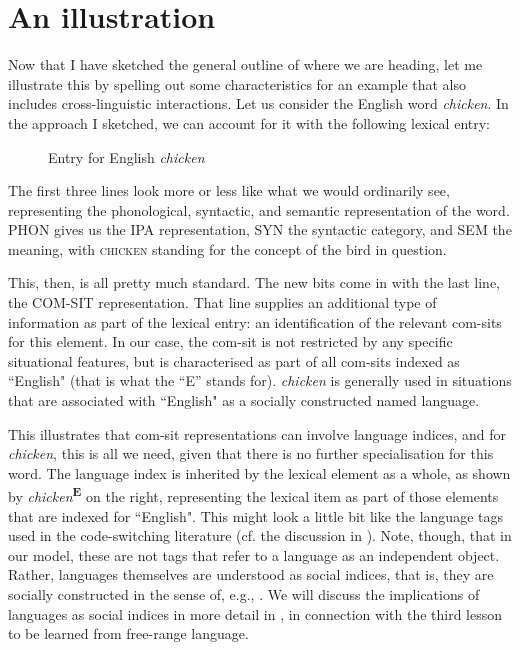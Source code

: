 \section{An illustration}
\label{sec:1.3}

Now that I have sketched the general outline of where we are heading, let me illustrate this by spelling out some characteristics for an example that also includes cross-linguistic interactions. Let us consider the English word \textit{chicken}. In the approach I sketched, we can account for it with the following lexical entry:

\begin{figure} [H]
\caption{Entry for English \textit{chicken}}
\label{fig:3}
\end{figure}

The first three lines look more or less like what we would ordinarily see, representing the phonological, syntactic, and semantic representation of the word. PHON gives us the IPA representation, SYN the syntactic category, and SEM the meaning, with \textsc{chicken} standing for the concept of the bird in question.

This, then, is all pretty much standard. The new bits come in with the last line, the COM-SIT representation. That line supplies an additional type of information as part of the lexical entry: an identification of the relevant com-sits for this element. In our case, the com-sit is not restricted by any specific situational features, but is characterised as part of all com-sits indexed as “English" (that is what the “E” stands for). \textit{chicken} is generally used in situations that are associated with “English" as a socially constructed named language.

This illustrates that com-sit representations can involve language indices, and for \textit{chicken}, this is all we need, given that there is no further specialisation for this word. The language index is inherited by the lexical element as a whole, as shown by \textit{chicken}\textbf{\textsuperscript{E}} on the right, representing the lexical item as part of those elements that are indexed for “English". This might look a little bit like the language tags used in the code-switching literature (cf. the discussion in \citealt{MacSwan2017}). Note, though, that in our model, these are not tags that refer to a language as an independent object. Rather, languages themselves are understood as social indices, that is, they are socially constructed in the sense of, e.g., \citet{Silverstein2003}. We will discuss the implications of languages as social indices in more detail in , in connection with the third lesson to be learned from free-range language.

